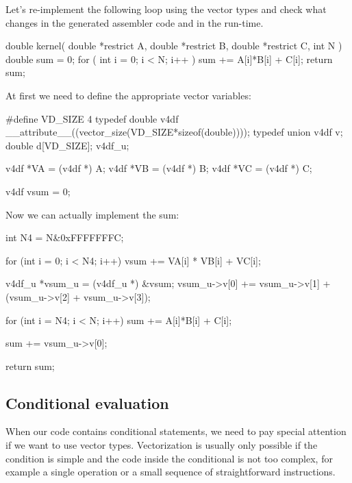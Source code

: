 \begin{exampleblock}
    Let's re-implement the following loop using the vector types and check what changes in the generated assembler code and in the run-time.

    \begin{codeblock}[language=C, morekeywords=double, morekeywords=restrict]
double kernel( double *restrict A, double *restrict B, double *restrict C, int N ) {
    double sum = 0;
    for ( int i = 0; i < N; i++ )
        sum += A[i]*B[i] + C[i];
    return sum;
}
\end{codeblock}

At first we need to define the appropriate vector variables:

\begin{codeblock}[language=C, firstnumber=7, morekeywords=v4df, morekeywords=v4df_u]
#define VD_SIZE 4
typedef double v4df __attribute__((vector_size(VD_SIZE*sizeof(double))));
typedef union {
    v4df v;
    double d[VD_SIZE];
} v4df_u;

v4df *VA = (v4df *) A;
v4df *VB = (v4df *) B;
v4df *VC = (v4df *) C;

v4df vsum = {0};
\end{codeblock}

Now we can actually implement the sum:

\begin{codeblock}[language=C, firstnumber=19, morekeywords=v4df, morekeywords=v4df_u]
int N4 = N&0xFFFFFFFC;

for (int i = 0; i < N4; i++) {
    vsum += VA[i] * VB[i] + VC[i];
}

v4df_u *vsum_u = (v4df_u *) &vsum;
vsum_u->v[0] += vsum_u->v[1] + (vsum_u->v[2] + vsum_u->v[3]);

for (int i = N4; i < N; i++) {
    sum += A[i]*B[i] + C[i];
}

sum += vsum_u->v[0];

return sum;
\end{codeblock}
\end{exampleblock}

\newpage

\subsection{Conditional evaluation}

When our code contains conditional statements, we need to pay special attention if we want to use vector types. Vectorization is usually only possible if the condition is simple and the code inside the conditional is not too complex, for example a single operation or a small sequence of straightforward instructions.


